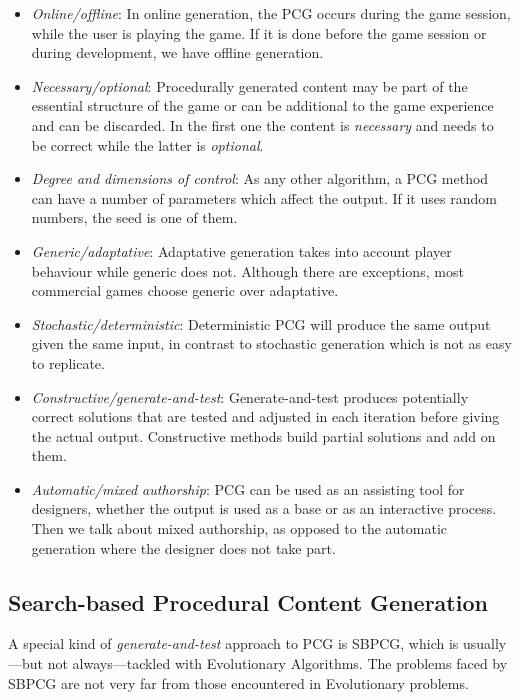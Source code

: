 \begin{itemize}
	\item \textit{Online/offline}: In online generation, the \ac{PCG} occurs during the game session, while the user is playing the game. If it is done before the game session or during development, we have offline generation. 
	\item \textit{Necessary/optional}: Procedurally generated content may be part of the essential structure of the game or can be additional to the game experience and can be discarded. In the first one the content is \textit{necessary} and needs to be correct while the latter is \textit{optional}.
	\item \textit{Degree and dimensions of control}: As any other algorithm, a \ac{PCG} method can have a number of parameters which affect the output. If it uses random numbers, the seed is one of them.
	\item \textit{Generic/adaptative}: Adaptative generation takes into account player behaviour while generic does not. Although there are exceptions, most commercial games choose generic over adaptative.
	\item \textit{Stochastic/deterministic}: Deterministic \ac{PCG} will produce the same output given the same input, in contrast to stochastic generation which is not as easy to replicate. 
	\item \textit{Constructive/generate-and-test}: Generate-and-test produces potentially correct solutions that are tested and adjusted in each iteration before giving the actual output. Constructive methods build partial solutions and add on them.
	\item \textit{Automatic/mixed authorship}: \ac{PCG} can be used as an assisting tool for designers, whether the output is used as a base or as an interactive process. Then we talk about mixed authorship, as opposed to the automatic generation where the designer does not take part. 
\end{itemize}

\subsection{Search-based Procedural Content Generation}

A special kind of \textit{generate-and-test} approach to \ac{PCG} is \acf{SBPCG}, which is usually---but not always---tackled with Evolutionary Algorithms. The problems faced by \ac{SBPCG} are not very far from those encountered in Evolutionary problems. 

